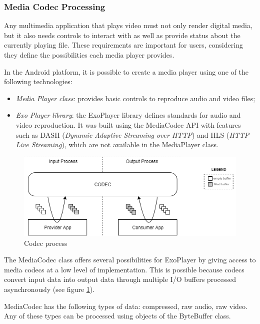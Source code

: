 \documentclass[runningheads]{llncs}
\begin{document}
\subsubsection{Media Codec Processing}

Any multimedia application that plays video must not only render digital media,
but it also needs controls to interact with as well as provide status about the currently playing file.
These requirements are important for users, considering they define the possibilities each media player provides.

In the Android platform, it is possible to create a media player using one of the following technologies:

\begin{itemize}
    \item \textit{Media Player class}: provides basic controls to reproduce audio and video files;
    \item \textit{Exo Player library}: the ExoPlayer \cite{ExoPlayer, ExoPlayerHello} library defines standards for audio and video reproduction.
 It was built using the MediaCodec API with features such as DASH
 (\textit{Dynamic Adaptive Streaming over HTTP}) and HLS (\textit{HTTP Live Streaming}), which are not available in the MediaPlayer class.
\end{itemize}

\begin{figure}[h!]
    \centerline{\includegraphics[scale=0.5]{images/codec.png}}
    \caption{Codec process}
    \label{fig-codec}
\end{figure}

The MediaCodec class offers several possibilities for ExoPlayer by giving access to media codecs at a
low level of implementation. This is possible because codecs convert input data
into output data through multiple I/O buffers processed asynchronously (see figure \ref{fig-codec}).

MediaCodec has the following types of data: compressed, raw audio, raw video. Any of these types can be processed using objects of the ByteBuffer class.
\end{document}
